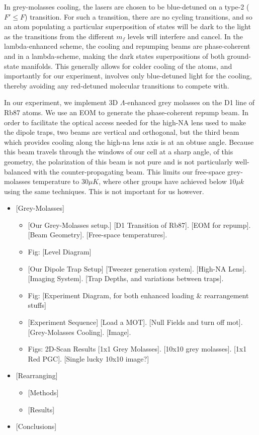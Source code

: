 \documentclass[aps,prl,amsmath,amssymb,groupedaddress,10pt,superscriptaddress,floatfix,twocolumn,showkeys,longbibliography]{revtex4-1} %
\begin{document}
In grey-molasses cooling, the lasers are chosen to be blue-detuned on a type-2 ($F' \le F$) transition. For such a transition, there are no cycling transitions, and so an atom populating a particular superposition of states will be dark to the light as the transitions from the different $m_f$ levels will interfere and cancel. In the lambda-enhanced scheme, the cooling and repumping beams are phase-coherent and in a lambda-scheme, making the dark states superpositions of both ground-state manifolds. This generally allows for colder cooling of the atoms, and importantly for our experiment, involves only blue-detuned light for the cooling, thereby avoiding any red-detuned molecular transitions to compete with.

In our experiment, we implement 3D $\Lambda$-enhanced grey molasses on the D1 line of Rb87 atoms. We use an EOM to generate the phase-coherent repump beam. In order to facilitate the optical access needed for the high-NA lens used to make the dipole traps, two beams are vertical and orthogonal, but the third beam which provides cooling along the high-na lens axis is at an obtuse angle. Because this beam travels through the windows of our cell at a sharp angle, of this geometry, the polarization of this beam is not pure and is not particularly well-balanced with the counter-propagating beam. This limits our free-space grey-molasses temperature to $30\mu K$, where other groups have achieved below $10\mu k$ using the same techniques. This is not important for us however.

\begin{itemize}
\item{[Grey-Molasses]}
    \begin{itemize}    
    \item{[Our Grey-Molasses setup.]}
        [D1 Transition of Rb87]. [EOM for repump]. [Beam Geometry]. [Free-space temperatures].
    \item{Fig: [Level Diagram]}
    \item{[Our Dipole Trap Setup]}
        [Tweezer generation system]. [High-NA Lens].  [Imaging System].  [Trap Depths, and variations between traps].
    \item{Fig: [Experiment Diagram, for both enhanced loading \& rearrangement stuffs]}
    
    \item{[Experiment Sequence]}
        [Load a MOT]. [Null Fields and turn off mot]. [Grey-Molasses Cooling]. [Image].
    
    \item{Figs: 2D-Scan Results}
        [1x1 Grey Molasses]. [10x10 grey molasses]. [1x1 Red PGC]. [Single lucky 10x10 image?]
    \end{itemize}
\item{[Rearranging]}
    \begin{itemize}
    \item{[Methods]}
    \item{[Results]}
    \end{itemize}
\item{[Conclusions]}

\end{itemize}
\end{document}
